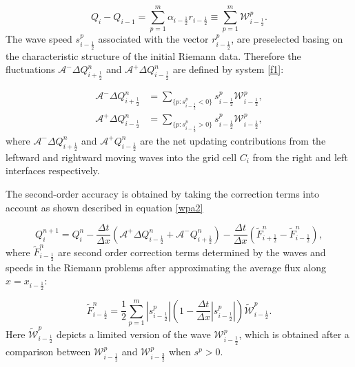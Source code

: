\documentclass[9pt,a4paper]{article}
\begin{document}
	\begin{equation}
		Q_{i} -  Q_{i-1} = \sum_{p=1}^{m}  \alpha_{i-\frac{1}{2}} r_{i-\frac{1}{2}} \equiv \sum_{p=1}^{m} \mathcal{W}_{i-\frac{1}{2}}^{p}.
		\label{wpa19}
	\end{equation}
	The wave speed $s_{i-\frac{1}{2}}^{p}$ associated with the vector $r_{i-\frac{1}{2}}^{p}$, are preselected basing on the characteristic structure of the initial Riemann data. Therefore the fluctuations $\mathcal{A^{-}}\Delta Q_{i+\frac{1}{2}}^{n}$  and $\mathcal{A^{+}}\Delta Q_{i-\frac{1}{2}}^{n} $ are defined by system \eqref{f1}:
	
	\begin{equation}
		\begin{aligned}
			\mathcal{A^{-}}\Delta Q_{i+\frac{1}{2}}^{n} &= \sum_{\{ p:s_{i-\frac{1}{2}}^{p}<0\}} s_{i-\frac{1}{2}}^{p} \mathcal{W}_{i-\frac{1}{2}}^{p},\\
			\mathcal{A^{+}}\Delta Q_{i-\frac{1}{2}}^{n} &=\sum_{\{ p:s_{i-\frac{1}{2}}^{p}>0\}} s_{i-\frac{1}{2}}^{p} \mathcal{W}_{i-\frac{1}{2}}^{p},
			\label{f1}
		\end{aligned}	
	\end{equation}
	where  $\mathcal{A^{-}}\Delta 	Q_{i+\frac{1}{2}}^{n}$ and  $\mathcal{A^{+}}Q_{i-\frac{1}{2}}^{n}$ are the net updating contributions from the  leftward and rightward moving waves into the grid cell $C_{i}$  from the right and left interfaces respectively.
	
	The second-order accuracy is obtained by taking the correction terms into account as shown described in equation \eqref{wpa2} 
	
	\begin{equation}
		Q_{i}^{n+1} =  Q_{i}^{n} - \frac{\Delta t}{\Delta x}(\mathcal{A^{+}}\Delta 	Q_{i-\frac{1}{2}}^{n} + \mathcal{A^{-}}Q_{i+\frac{1}{2}}^{n}) -  \frac{\Delta t}{\Delta x} (\tilde{F}_{i+\frac{1}{2}}^{n} - \tilde{F}_{i-\frac{1}{2}}^{n}),
		\label{wpa2}
	\end{equation}
	where $\tilde{F}_{i-\frac{1}{2}}^{n} $ are second order correction terms determined by the waves and speeds in the Riemann problems after approximating the average flux along  $x = x_{i - \frac{1}{2}}$:
	
	\begin{equation}
		\tilde{F}_{i-\frac{1}{2}}^{n} = \frac{1}{2} \sum_{p=1}^{m}  |s_{i- \frac{1}{2}}^{p}| \left( 1 - \frac{\Delta t}{\Delta x} |s_{i- \frac{1}{2}}^{p}|\right) \tilde{\mathcal{W}}_{i-\frac{1}{2}}^{p}.
		\label{wpa13}
	\end{equation}
	Here $\tilde{\mathcal{W}}_{i-\frac{1}{2}}^{p} $ depicts a limited version of the wave $\mathcal{W}_{i-\frac{1}{2}}^{p} $, which is obtained after a comparison between $\mathcal{W}_{i-\frac{1}{2}}^{p} $ and $\mathcal{W}_{i-\frac{3}{2}}^{p} $ when $s^{p} >0$.
	
\end{document}
